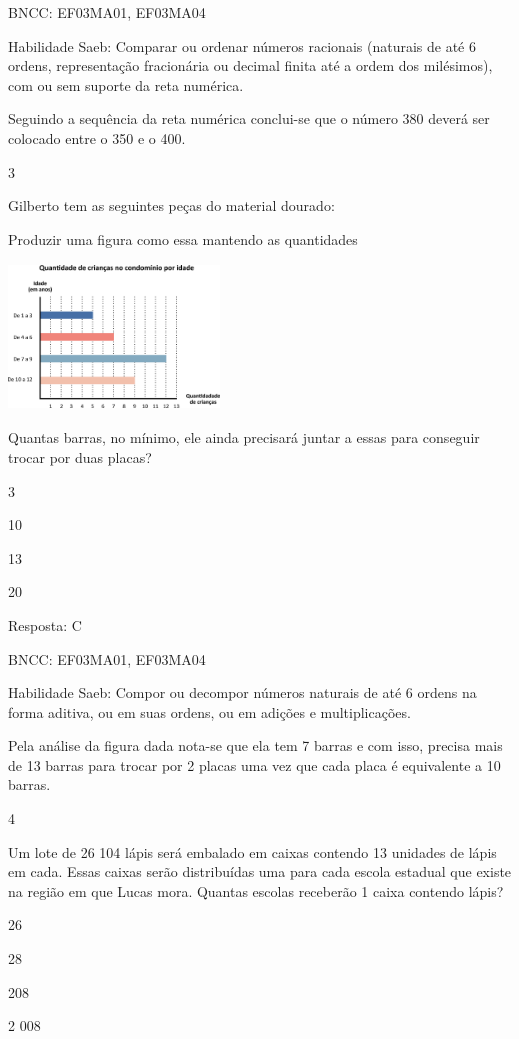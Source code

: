 \begin{escolha}
\begin{escolha}
BNCC: EF03MA01, EF03MA04

Habilidade Saeb: Comparar ou ordenar números racionais (naturais de até
6 ordens, representação fracionária ou decimal finita até a ordem dos
milésimos), com ou sem suporte da reta numérica.

Seguindo a sequência da reta numérica conclui-se que o número 380 deverá
ser colocado entre o 350 e o 400.

\num{3}

Gilberto tem as seguintes peças do material dourado:

Produzir uma figura como essa mantendo as quantidades

\includegraphics[width=2.20852in,height=1.52513in]{media/image118.png}

Quantas barras, no mínimo, ele ainda precisará juntar a essas para
conseguir trocar por duas placas?

\begin{escolha}
\item
  3
\item
  10
\item
  13
\item
  20
\end{escolha}

Resposta: C

BNCC: EF03MA01, EF03MA04

Habilidade Saeb: Compor ou decompor números naturais de até 6 ordens na
forma aditiva, ou em suas ordens, ou em adições e multiplicações.

Pela análise da figura dada nota-se que ela tem 7 barras e com isso,
precisa mais de 13 barras para trocar por 2 placas uma vez que cada
placa é equivalente a 10 barras.

\num{4}

Um lote de 26 104 lápis será embalado em caixas contendo 13 unidades de
lápis em cada. Essas caixas serão distribuídas uma para cada escola
estadual que existe na região em que Lucas mora. Quantas escolas
receberão 1 caixa contendo lápis?

\begin{escolha}
\item
  26
\item
  28
\item
  208
\item
  2 008
\end{escolha}


\end{escolha}
\end{escolha}
